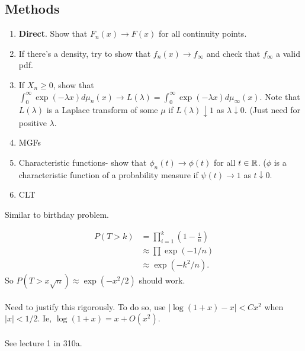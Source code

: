 \documentclass{article}
\newcommand{\answer}[1]{%
  \begin{tcolorbox}[
    colback=gray!9.8,
    boxrule=0.5pt,
    breakable]
  \small #1
  \end{tcolorbox}}
\begin{document}
\subsection{Methods}
\begin{enumerate}
	\item \textbf{Direct}. Show that $F_n(x) \to F(x)$ for all continuity points.
	\item If there's a density, try to show that $f_n(x) \to f_\infty$ and check that $f_\infty$ a valid pdf. 
	\item If $X_n \geq 0$, show that $\int_0^\infty \exp(-\lambda x) d\mu_n (x) \to L(\lambda) = \int_0^\infty \exp(-\lambda x) d\mu_\infty (x)$. Note that $L(\lambda)$ is a Laplace transform of some $\mu$ if $L(\lambda)\downarrow 1$ as $\lambda\downarrow 0$. (Just need for positive $\lambda$. 
	\item MGFs
	\item Characteristic functions- show that $\phi_n(t) \to \phi(t)$ for all $t\in \mathbb R$. ($\phi$ is a characteristic function of a probability measure if $\psi(t) \to 1$ as $t\downarrow 0$. 
	\item CLT 
\end{enumerate}

\begin{example}
Similar to birthday problem. 
\answer{

\begin{align}
	P(T>k) & = \prod_{i=1}^k (1-\frac{i}{n})\\
	&\approx \prod \exp(-1/n)\\
	& \approx \exp(-k^2/n).
\end{align}
So $P(T> x\sqrt{n}) \approx \exp(-x^2/2)$ should work.\\\\
Need to justify this rigorously. To do so, use $|\log (1+x) - x| < Cx^2$ when $|x| <1/2$. Ie, $\log (1+x) = x + O(x^2)$. \\\\ 

See lecture 1 in 310a. 

}
\end{example}

\end{document}
